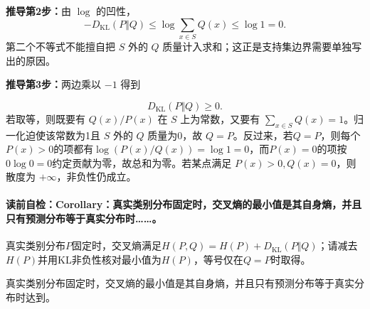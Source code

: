 \textbf{推导第2步：}由 $\log$ 的凹性，
\[
-D_{\mathrm{KL}}(P\Vert Q)
\le \log\sum_{x\in S}Q(x)
\le \log 1=0.
\]
第二个不等式不能擅自把 $S$ 外的 $Q$ 质量计入求和；这正是支持集边界需要单独写出的原因。

\textbf{推导第3步：}两边乘以 $-1$ 得到

\begin{equation}\label{eq:V1-C06-kl-nonnegative}
D_{\mathrm{KL}}(P\Vert Q)\ge0.
\end{equation}
若取等，则既要有 $Q(x)/P(x)$ 在 $S$ 上为常数，又要有 $\sum_{x\in S}Q(x)=1$。归一化迫使该常数为1且 $S$ 外的 $Q$ 质量为0，故 $Q=P$。反过来，若$Q=P$，则每个$P(x)>0$的项都有$\log(P(x)/Q(x))=\log1=0$，而$P(x)=0$的项按$0\log0=0$约定贡献为零，故总和为零。若某点满足 $P(x)>0,Q(x)=0$，则散度为 $+\infty$，非负性仍成立。

\label{struct:V1-C06-CH14}
\paragraph{读前自检：Corollary：真实类别分布固定时，交叉熵的最小值是其自身熵，并且只有预测分布等于真实分布时……。}真实类别分布$P$固定时，交叉熵满足$H(P,Q)=H(P)+D_{\mathrm{KL}}(P\Vert Q)$；请减去$H(P)$并用KL非负性核对最小值为$H(P)$，等号仅在$Q=P$时取得。\par

\begin{corollary}
真实类别分布固定时，交叉熵的最小值是其自身熵，并且只有预测分布等于真实分布时达到。
\end{corollary}


